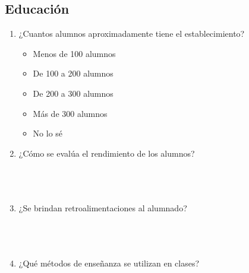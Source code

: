 \documentclass{article}
\begin{document}
\newpage
\subsection*{Educación}
\begin{enumerate}
    \item ¿Cuantos alumnos aproximadamente tiene el establecimiento? 
        \begin{itemize}[label=$\square$]
            \item Menos de 100 alumnos
            \item De 100 a 200 alumnos
            \item De 200 a 300 alumnos
            \item Más de 300 alumnos
            \item No lo sé
        \end{itemize}
    \item ¿Cómo se evalúa el rendimiento de los alumnos?  \\[0.5cm]
        \underline{\hspace{0.95\linewidth}} \vspace{0.3cm} \\
        \underline{\hspace{0.95\linewidth}} \vspace{0.3cm} \\
        \underline{\hspace{0.95\linewidth}} \vspace{0.3cm} \\
    \item ¿Se brindan retroalimentaciones al alumnado? \\[0.5cm]
        \underline{\hspace{0.95\linewidth}} \vspace{0.3cm} \\
        \underline{\hspace{0.95\linewidth}} \vspace{0.3cm} \\
        \underline{\hspace{0.95\linewidth}} \vspace{0.3cm} \\
    \item ¿Qué métodos de enseñanza se utilizan en clases? %

\end{enumerate}
\end{document}
